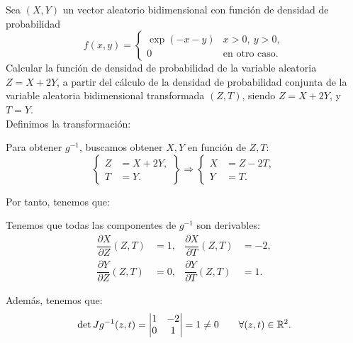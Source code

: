 \begin{ejercicio}
    Sea $(X,Y)$ un vector aleatorio bidimensional con función de densidad de probabilidad
    \begin{equation*}
        f(x, y) = \begin{cases}
            \exp(-x-y) & x>0,~y>0, \\
            0 & \text{en otro caso}.
        \end{cases}
    \end{equation*}
    Calcular la función de densidad de probabilidad de la variable aleatoria $Z=X+2Y$, a partir del cálculo de la densidad de probabilidad conjunta de la variable aleatoria bidimensional transformada $(Z,T)$, siendo $Z=X+2Y$, y $T=Y$.\\

    Definimos la transformación:

    Para obtener $g^{-1}$, buscamos obtener $X,Y$ en función de $Z,T$:
    \begin{equation*}
        \left\{\begin{aligned}
            Z&=X+2Y, \\
            T&=Y.
        \end{aligned}\right\}\Longrightarrow
        \left\{\begin{aligned}
            X&=Z-2T, \\
            Y&=T.
        \end{aligned}\right.
    \end{equation*}

    Por tanto, tenemos que:

    Tenemos que todas las componentes de $g^{-1}$ son derivables:
    \begin{align*}
        \dfrac{\partial X}{\partial Z}(Z,T)&=1, & \dfrac{\partial X}{\partial T}(Z,T)&=-2,\\
        \dfrac{\partial Y}{\partial Z}(Z,T)&=0, & \dfrac{\partial Y}{\partial T}(Z,T)&=1.
    \end{align*}

    Además, tenemos que:
    \begin{equation*}
        \det Jg^{-1}(z,t)=\begin{vmatrix}
            1 & -2 \\
            0 & 1
        \end{vmatrix}=1\neq 0 \qquad \forall (z,t)\in\mathbb{R}^2.
    \end{equation*}


\end{ejercicio}
